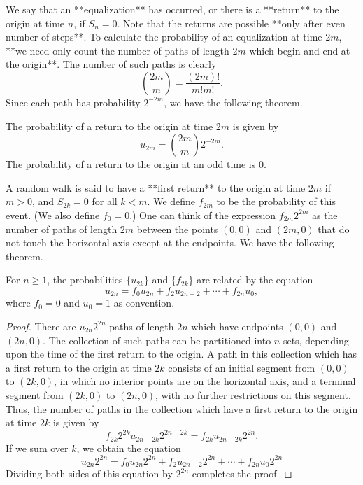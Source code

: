 We say that an **equalization** has occurred, or there is a **return** to the origin at time $n$, if $S_n = 0$. Note that the returns are possible **only after even number of steps**. To calculate
the probability of an equalization at time $2m$, **we need only count the number of paths of length $2m$ which begin and end at the origin**. The number of such paths is clearly
\begin{equation*}
    \binom{2m}{m} = \frac{(2m)!}{m! m!}.
\end{equation*}
Since each path has probability $2^{-2m}$, we have the following theorem.
\begin{theorem}
The probability of a return to the origin at time $2m$ is given by
\begin{equation*}
    u_{2 m}= \binom{2m}{m} 2^{-2 m}.
\end{equation*}
The probability of a return to the origin at an odd time is 0.
\end{theorem}

A random walk is said to have a **first return** to the origin at time $2m$ if $m > 0$, and $S_{2k} = 0$ for all $k < m$. We define $f_{2m}$ to be the probability of this event. (We also define $f_0 = 0$.) One can think
of the expression $f_{2m}2^{2m}$ as the number of paths of length $2m$ between the points $(0, 0)$ and $(2m, 0)$ that do not touch the horizontal axis except at the endpoints. We have the following theorem.
\begin{theorem}
For $n \geq 1$, the probabilities $\{u_{2k}\}$ and $\{f_{2k}\}$ are related by the equation
\begin{equation*}
    u_{2 n}=f_{0} u_{2 n}+f_{2} u_{2 n-2}+\cdots+f_{2 n} u_{0},
\end{equation*}
where $f_0 = 0$ and $u_0 = 1$ as convention.
\end{theorem}

\begin{proof}
There are $u_{2n}2^{2n}$ paths of length $2n$ which have endpoints $(0, 0)$ and $(2n, 0)$. The collection of such paths can be partitioned into $n$ sets, depending upon the time of the first return to the origin. A path in this collection which has a first return to the origin at time $2k$ consists of an initial segment from $(0, 0)$ to $(2k, 0)$, in which no interior points are on the horizontal axis, and a terminal segment from $(2k, 0)$
to $(2n, 0)$, with no further restrictions on this segment. Thus, the number of paths in the collection which have a first return to the origin at time $2k$ is given by
\begin{equation*}
    f_{2 k} 2^{2 k} u_{2 n-2 k} 2^{2 n-2 k}=f_{2 k} u_{2 n-2 k} 2^{2 n}.
\end{equation*}
If we sum over $k$, we obtain the equation
\begin{equation*}
    u_{2 n} 2^{2 n}=f_{0} u_{2 n} 2^{2 n}+f_{2} u_{2 n-2} 2^{2 n}+\cdots+f_{2 n} u_{0} 2^{2 n}
\end{equation*}
Dividing both sides of this equation by $2^{2n}$ completes the proof.
\end{proof}

